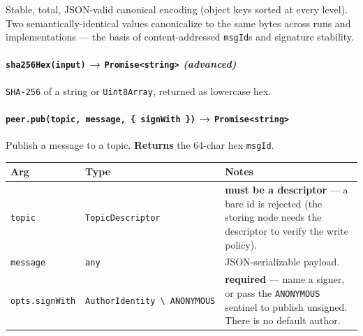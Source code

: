 \documentclass[
  nobib]{tufte-handout}
\newcounter{none} %
\renewcommand{\subsubsection}[1]{\medskip\par\noindent{\normalsize\bfseries #1}\par\nobreak\smallskip}
\begin{document}
Stable, total, JSON-valid canonical encoding (object keys sorted at
every level). Two semantically-identical values canonicalize to the same
bytes across runs and implementations --- the basis of content-addressed
\texttt{msgId}s and signature stability.

\paragraph{\texorpdfstring{\texttt{sha256Hex(input)} →
\texttt{Promise\textless{}string\textgreater{}}
\emph{(advanced)}}{sha256Hex(input) → Promise\textless string\textgreater{} (advanced)}}\label{sha256hexinput-promisestring-advanced}

\texttt{SHA-256} of a string or \texttt{Uint8Array}, returned as
lowercase hex.

\subsubsection{4.2 publish / subscribe}\label{publish-subscribe}

\paragraph{\texorpdfstring{\texttt{peer.pub(topic,\ message,\ \{\ signWith\ \})}
→
\texttt{Promise\textless{}string\textgreater{}}}{peer.pub(topic, message, \{ signWith \}) → Promise\textless string\textgreater{}}}\label{peer.pubtopic-message-signwith-promisestring}

Publish a message to a topic. \textbf{Returns} the 64-char hex
\texttt{msgId}.

{\def\LTcaptype{none} %
\begin{longtable}[]{@{}
  >{\raggedright\arraybackslash}p{}
  >{\raggedright\arraybackslash}p{}
  >{\raggedright\arraybackslash}p{}@{}}
\toprule\noalign{}
\begin{minipage}[b]{\linewidth}\raggedright
Arg
\end{minipage} & \begin{minipage}[b]{\linewidth}\raggedright
Type
\end{minipage} & \begin{minipage}[b]{\linewidth}\raggedright
Notes
\end{minipage} \\
\midrule\noalign{}
\endhead
\bottomrule\noalign{}
\endlastfoot
\texttt{topic} & \texttt{TopicDescriptor} & \textbf{must be a
descriptor} --- a bare id is rejected (the storing node needs the
descriptor to verify the write policy). \\
\texttt{message} & \texttt{any} & JSON-serializable payload. \\
\texttt{opts.signWith} &
\texttt{AuthorIdentity\ \textbackslash{}\textbar{}\ ANONYMOUS} &
\textbf{required} --- name a signer, or pass the \texttt{ANONYMOUS}
sentinel to publish unsigned. There is no default author. \\
\end{longtable}
}
\end{document}
